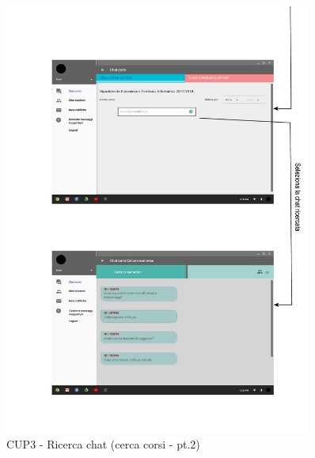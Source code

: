\begin{figure}
	\centering
	\includegraphics[width=0.9\textwidth]{imgs/gruppo6/activities/act_cup3_ricerca_chat_corsi2.pdf}
	\caption{CUP3 - Ricerca chat (cerca corsi - pt.2)}
	\label{fig:act-cup3-6}
\end{figure}

